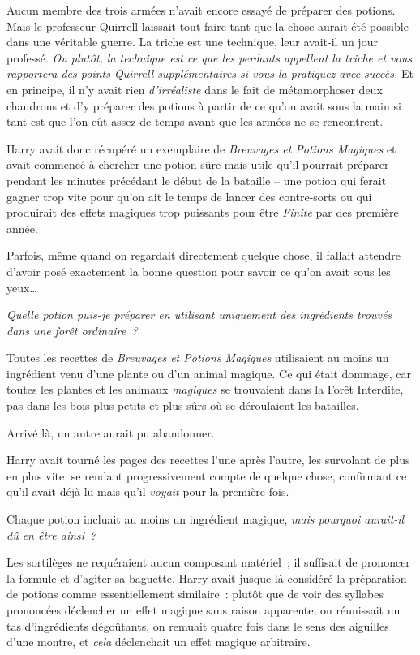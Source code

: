 Aucun membre des trois armées n'avait encore essayé de préparer des potions.
Mais le professeur Quirrell laissait tout faire tant que la chose aurait été possible dans une véritable guerre.
La triche est une technique, leur avait-il un jour professé.
\emph{Ou plutôt, la technique est ce que les perdants appellent la triche et vous rapportera des points Quirrell supplémentaires si vous la pratiquez avec succès.} Et en principe, il n'y avait rien \emph{d'irréaliste} dans le fait de métamorphoser deux chaudrons et d'y préparer des potions à partir de ce qu'on avait sous la main si tant est que l'on eût assez de temps avant que les armées ne se rencontrent.

Harry avait donc récupéré un exemplaire de \emph{Breuvages et Potions Magiques} et avait commencé à chercher une potion sûre mais utile qu'il pourrait préparer pendant les minutes précédant le début de la bataille -- une potion qui ferait gagner trop vite pour qu'on ait le temps de lancer des contre-sorts ou qui produirait des effets magiques trop puissants pour être \emph{Finite} par des première année.

Parfois, même quand on regardait directement quelque chose, il fallait attendre d'avoir posé exactement la bonne question pour savoir ce qu'on avait sous les yeux…

\emph{Quelle potion puis-je préparer en utilisant uniquement des ingrédients trouvés dans une forêt ordinaire~?}

Toutes les recettes de \emph{Breuvages et Potions Magiques} utilisaient au moins un ingrédient venu d'une plante ou d'un animal magique.
Ce qui était dommage, car toutes les plantes et les animaux \emph{magiques} se trouvaient dans la Forêt Interdite, pas dans les bois plus petits et plus sûrs où se déroulaient les batailles.

Arrivé là, un autre aurait pu abandonner.

Harry avait tourné les pages des recettes l'une après l'autre, les survolant de plus en plus vite, se rendant progressivement compte de quelque chose, confirmant ce qu'il avait déjà lu mais qu'il \emph{voyait} pour la première fois.

Chaque potion incluait au moins un ingrédient magique, \emph{mais pourquoi aurait-il dû en être ainsi~?}

Les sortilèges ne requéraient aucun composant matériel~; il suffisait de prononcer la formule et d'agiter sa baguette.
Harry avait jusque-là considéré la préparation de potions comme essentiellement similaire~: plutôt que de voir des syllabes prononcées déclencher un effet magique sans raison apparente, on réunissait un tas d'ingrédients dégoûtants, on remuait quatre fois dans le sens des aiguilles d'une montre, et \emph{cela} déclenchait un effet magique arbitraire.

